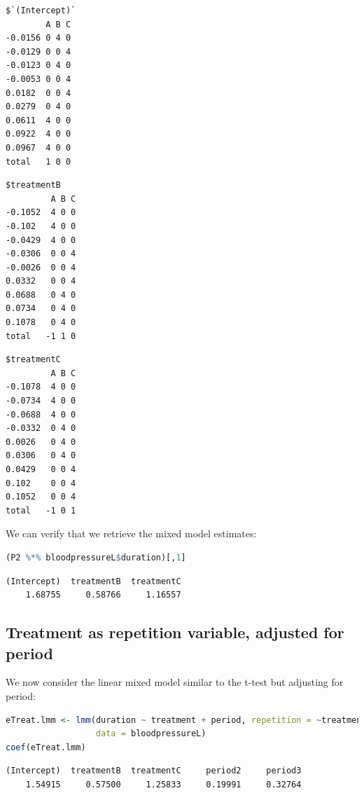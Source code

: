 \documentclass[12pt]{article}
\begin{document}
\begin{minipage}{0.3\linewidth}
\label{}
\begin{verbatim}
$`(Intercept)`
        A B C
-0.0156 0 4 0
-0.0129 0 0 4
-0.0123 0 4 0
-0.0053 0 0 4
0.0182  0 0 4
0.0279  0 4 0
0.0611  4 0 0
0.0922  4 0 0
0.0967  4 0 0
total   1 0 0
\end{verbatim}

\end{minipage}
\begin{minipage}{0.3\linewidth}
\label{}
\begin{verbatim}
$treatmentB
         A B C
-0.1052  4 0 0
-0.102   4 0 0
-0.0429  4 0 0
-0.0306  0 0 4
-0.0026  0 0 4
0.0332   0 0 4
0.0688   0 4 0
0.0734   0 4 0
0.1078   0 4 0
total   -1 1 0
\end{verbatim}
\end{minipage}
\begin{minipage}{0.3\linewidth}
\label{}
\begin{verbatim}
$treatmentC
         A B C
-0.1078  4 0 0
-0.0734  4 0 0
-0.0688  4 0 0
-0.0332  0 4 0
0.0026   0 4 0
0.0306   0 4 0
0.0429   0 0 4
0.102    0 0 4
0.1052   0 0 4
total   -1 0 1
\end{verbatim}
\end{minipage}

\noindent We can verify that we retrieve the mixed model estimates:
\begin{lstlisting}[language=r,numbers=none]
(P2 %*% bloodpressureL$duration)[,1]
\end{lstlisting}

\label{}
\begin{verbatim}
(Intercept)  treatmentB  treatmentC 
    1.68755     0.58766     1.16557
\end{verbatim}
\subsection{Treatment as repetition variable, adjusted for period}
\label{SM:lmm2average3}
We now consider the linear mixed model similar to the t-test but
adjusting for period:
\begin{lstlisting}[language=r,numbers=none]
eTreat.lmm <- lmm(duration ~ treatment + period, repetition = ~treatment|id,
                  data = bloodpressureL)
coef(eTreat.lmm)
\end{lstlisting}

\label{}
\begin{verbatim}
(Intercept)  treatmentB  treatmentC     period2     period3 
    1.54915     0.57500     1.25833     0.19991     0.32764
\end{verbatim}
\end{document}
